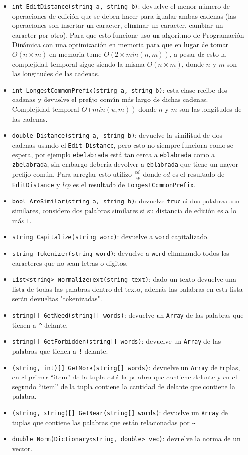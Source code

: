 \documentclass{report}
\begin{document}
\begin{itemize}
	\item {\tt int EditDistance(string a, string b)}:  devuelve el menor n\'umero de operaciones de edici\'on
que se deben hacer para igualar ambas cadenas (las operaciones son insertar un caracter, eliminar un caracter, 
cambiar un caracter por otro). Para que esto funcione uso un algoritmo de Programaci\'on Din\'amica con una 
optimizaci\'on en memoria para que en lugar de tomar $O(n \times m)$ en memoria tome $O(2 \times min(n, m))$, 
a pesar de esto la complejidad temporal sigue siendo la misma $O(n \times m)$, donde $n$ y $m$ son las longitudes de las cadenas.
	\item {\tt int LongestCommonPrefix(string a, string b)}: esta clase recibe dos cadenas y
devuelve el prefijo com\'un m\'as largo de dichas cadenas. Complejidad temporal $O(min(n, m))$ donde $n$ y $m$ 
son las longitudes de las cadenas.
	\item {\tt double Distance(string a, string b)}: devuelve la similitud de dos cadenas usando el {\tt Edit Distance}, pero
esto no siempre funciona como se espera, por ejemplo {\tt ebelabrada} est\'a tan cerca a {\tt eblabrada} como a {\tt zbelabrada}, 
sin embargo deber\'ia devolver a {\tt eblabrada} que tiene un mayor prefijo com\'un. Para arreglar esto utilizo 
$\frac{ed}{lcp}$ donde $ed$ es el resultado de {\tt EditDistance} y $lcp$ es el resultado de {\tt LongestCommonPrefix}.
	\item {\tt bool AreSimilar(string a, string b)}: devuelve {\tt true} si dos palabras son similares, considero dos palabras
similares si su distancia de edici\'on es a lo m\'as $1$.
	\item {\tt string Capitalize(string word)}: devuelve a {\tt word} capitalizado.
	\item {\tt string Tokenizer(string word)}: devuelve a {\tt word} eliminando todos los caracteres que no sean letras o digitos.
	\item {\tt List<string> NormalizeText(string text)}: dado un texto devuelve una lista de todas las palabras dentro del texto, 
	adem\'as las palabras en esta lista ser\'an devueltas "tokenizadas".
	\item {\tt string[] GetNeed(string[] words)}: devuelve un {\tt Array} de las palabras que tienen a {\tt \^{}} delante.
	\item {\tt string[] GetForbidden(string[] words)}: devuelve un {\tt Array} de las palabras que tienen a {\tt !} delante.
	\item {\tt (string, int)[] GetMore(string[] words)}: devuelve un {\tt Array} de tuplas, en el primer ``item'' de la tupla 
	est\'a la palabra que contiene {\tt *} delante y en el segundo ``item'' de la tupla contiene la cantidad de {\tt *} delante 
	que contiene la palabra.
	\item {\tt (string, string)[] GetNear(string[] words)}: devuelve un {\tt Array} de tuplas que contiene las palabras que est\'an relacionadas por 
	{\tt \~{}}
	\item {\tt double Norm(Dictionary<string, double> vec)}: devuelve la norma de un vector.
\end{itemize}
\end{document}
